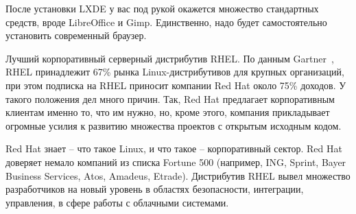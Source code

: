 После установки LXDE у вас под рукой окажется множество стандартных средств, вроде LibreOffice и Gimp. Единственно, надо будет самостоятельно установить современный браузер.

Лучший корпоративный серверный дистрибутив RHEL. По данным Gartner~\cite{linuxOffDoc}, RHEL принадлежит 67\% рынка Linux-дистрибутивов для крупных организаций, при этом подписка на RHEL приносит компании Red Hat около 75\% доходов. У такого положения дел много причин. Так, Red Hat предлагает корпоративным клиентам именно то, что им нужно, но, кроме этого, компания прикладывает огромные усилия к развитию множества проектов с открытым исходным кодом.

Red Hat знает – что такое Linux, и что такое – корпоративный сектор. Red Hat доверяет немало компаний из списка Fortune 500 (например, ING, Sprint, Bayer Business Services, Atos, Amadeus, Etrade). Дистрибутив RHEL вывел множество разработчиков на новый уровень в областях безопасности, интеграции, управления, в сфере работы с облачными системами.


